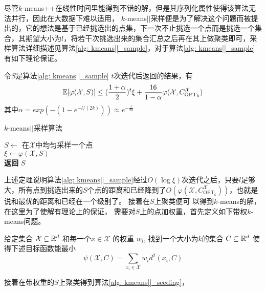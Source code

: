 尽管$k$-means++在线性时间里能得到不错的解，但是其序列化属性使得该算法无法并行，因此在大数据下难以适用， $k$-means\(\vert \vert\)采样便是为了解决这个问题而被提出的，它的想法是基于已经挑选出的点集，下一次不止挑选一个点而是挑选一个集合，其期望大小为$l$，将若干次挑选出来的集合汇总之后再在其上做聚类即可，采样算法详细描述见算法\ref{alg: kmeans||_sample}，对于算法\ref{alg: kmeans||_sample}有如下理论保证。
\begin{theorem}
    \label{theo: kmeans||_performance_1}
    令$S$是算法\ref{alg: kmeans||_sample} $t$次迭代后返回的结果，有
    \begin{equation}
    \mathbb{E}[\varphi(\mathcal{X},S)] \leq (\frac{1+\alpha}{2})^t \xi + \frac{16}{1-\alpha}\varphi(\mathcal{X},C_{\text{OPT}_k}^{\mathcal{X}})
    \end{equation}
    其中$\alpha=exp(-(1-e^{-l/(2k)})) \approx e^{-\frac{l}{2k}}$
\end{theorem}
\begin{algorithm}
    \caption{$k$-means\(\vert \vert\)采样算法}\label{alg: kmeans||_sample}
    $S \gets$ 在$\mathcal{X}$中均匀采样一个点 \\
    $\xi \gets \varphi(\mathcal{X},S)$ \\
    \textbf{返回} $S$
\end{algorithm}
上述定理说明算法\ref{alg: kmeans||_sample}经过$O(\log \xi)$次迭代之后，只要$l$足够大，所有点到挑选出来的$S$个点的距离和已经降到了$O(\varphi(\mathcal{X},C_{\text{OPT}_k}^\mathcal{X}))$，也就是说和最优的距离和已经在一个级别了。 接着在$S$上聚类便可
以得到$k$-means的解， 在这里为了使解有理论上的保证， 需要对$S$上的点加权重，首先定义如下带权$k$-means问题。
\begin{definition}[带权$k$-means问题]
    \label{def: weighted_kmeans}
    给定集合 $\mathcal{X} \subseteq \mathbb{R}^d$ 和每一个$x \in \mathcal{X}$ 的权重 $w_i$, 找到一个大小为$k$的集合 $C \subseteq \mathbb{R}^d$ 使得下述目标函数能最小
    \begin{equation}
        \psi(\mathcal{X},C) = \sum_{x_i \in \mathcal{X}}w_i d^2 (x_i,C)
    \end{equation}
\end{definition}
接着在带权重的$S$上聚类得到算法\ref{alg: kmeans||_seeding}，
